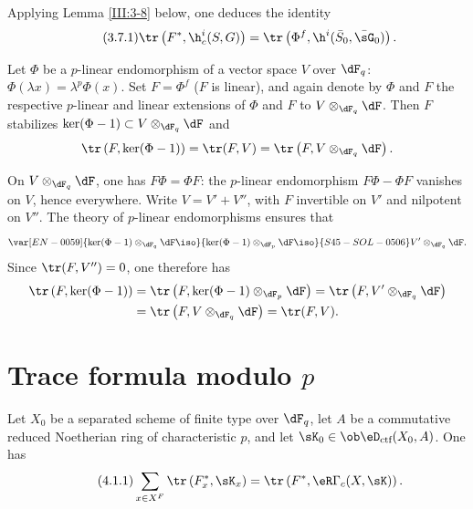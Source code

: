Applying Lemma \ref{III:3-8} below, one deduces the identity
\begin{equation*}\tag{3.7.1}\label{III:eq:3-7-1}
  \tr\left(F^*,\h_c^i(S,G)\right) = \tr\left(\Phi^f,\h^i(\bar S_0,\bar\sG_0)\right) \text{.}
\end{equation*}






\begin{lemma_}\label{III:3-8}
Let $\Phi$ be a $p$-linear endomorphism of a vector space $V$ over
$\dF_q$: $\Phi(\lambda x) = \lambda^p\Phi(x)$. Set $F=\Phi^f$ ($F$ is
linear), and again denote by $\Phi$ and $F$ the respective $p$-linear and linear extensions of $\Phi$ and $F$ to $V\otimes_{\dF_q}\dF$. Then $F$ stabilizes
$\ker(\Phi-1)\subset V\otimes_{\dF_q}\dF$ and
\[
  \tr\left(F,\ker(\Phi-1)\right) = \tr(F,V) = \tr\left(F,V\otimes_{\dF_q}\dF\right) \text{.}
\]
\end{lemma_}

On $V\otimes_{\dF_q}\dF$, one has $F\Phi = \Phi F$: the $p$-linear
endomorphism $F\Phi-\Phi F$ vanishes on $V$, hence everywhere. Write
$V=V'+V''$, with $F$ invertible on $V'$ and nilpotent on $V''$. The theory
of $p$-linear endomorphisms ensures that
\[
  \var[EN-0059]{\ker(\Phi-1)\otimes_{\dF_q}\dF \iso}{\ker(\Phi-1)\otimes_{\dF_p}\dF \iso}{S45-SOL-0506} V'\otimes_{\dF_q}\dF \text{.}
\]
Since $\tr(F,V'') = 0$, one therefore has
\begin{align*}
  \tr\left(F,\ker(\Phi-1)\right)
    &= \tr\left(F,\ker(\Phi-1)\otimes_{\dF_p}\dF\right) = \tr\left(F,V'\otimes_{\dF_q}\dF\right) \\
    &= \tr\left(F,V\otimes_{\dF_q}\dF\right) = \tr(F,V) \text{.}
\end{align*}











\section{Trace formula modulo \texorpdfstring{$p$}{p}}\label{III:4}






\begin{theorem_}\label{III:4-1}
Let $X_0$ be a separated scheme of finite type over $\dF_q$, let $A$ be a
commutative reduced Noetherian ring of characteristic $p$, and let
$\sK_0\in\ob\eD_\textnormal{ctf}(X_0,A)$. One has
\begin{equation*}\tag{4.1.1}\label{III:eq:4-1-1}
  \sum_{x\in X^F} \tr\left(F_x^*,\sK_x\right) = \tr\left(F^*,\eR\Gamma_c(X,\sK)\right) \text{.}
\end{equation*}
\end{theorem_}






